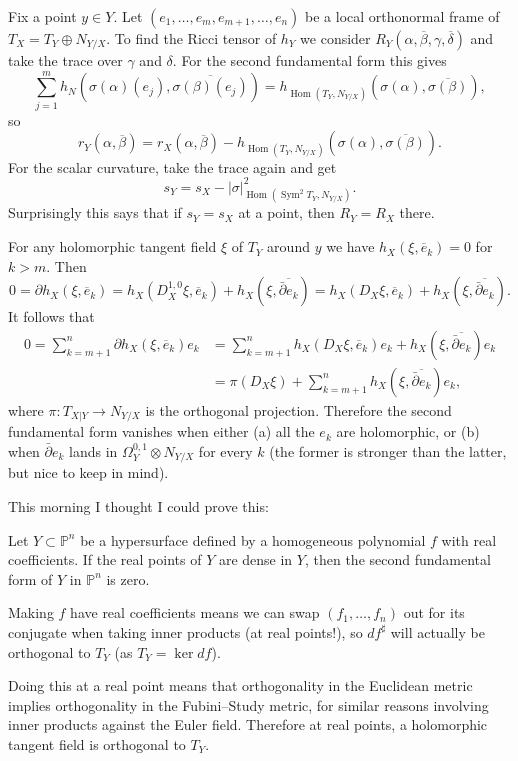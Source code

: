 \documentclass[11pt]{article}
\theoremstyle{definition}
\newcommand{\kk}[1]{\mathbb{#1}}
\def\ov#1{\overline{#1}}
\DeclareMathOperator{\Hom}{Hom}
\begin{document}
Fix a point $y \in Y$.
Let $(e_1,\ldots,e_m,e_{m+1},\ldots,e_n)$ be a local orthonormal frame of $T_X =
T_Y \oplus N_{Y/X}$.
To find the Ricci tensor of $h_Y$ we consider $R_Y(\alpha, \ov\beta, \gamma,
\ov\delta)$ and take the trace over $\gamma$ and $\delta$. For the second
fundamental form this gives
$$
\sum_{j=1}^m h_N(\sigma(\alpha)(e_j), \ov{\sigma(\beta)(e_j)})
= h_{\Hom(T_Y, N_{Y/X})}(\sigma(\alpha), \ov{\sigma(\beta)}),
$$
so
$$
r_Y(\alpha, \ov\beta)
= r_X(\alpha, \ov\beta)
- h_{\Hom(T_Y, N_{Y/X})}(\sigma(\alpha), \ov{\sigma(\beta)}).
$$
For the scalar curvature, take the trace again and get
$$
s_Y = s_X - |\sigma|^2_{\Hom(\operatorname{Sym}^2 T_Y, N_{Y/X})}.
$$
Surprisingly this says that if $s_Y = s_X$ at a point, then $R_Y = R_X$ there.


For any holomorphic tangent field $\xi$ of $T_Y$ around $y$ we have
$h_X(\xi, \ov e_k) = 0$ for $k > m$. Then
$$
0 = \partial h_X(\xi, \ov e_k)
= h_X(D_X^{1,0} \xi, \ov e_k) + h_X(\xi, \ov{\bar\partial e_k})
= h_X(D_X \xi, \ov e_k) + h_X(\xi, \ov{\bar\partial e_k}).
$$
It follows that
\begin{align*}
0
= \!\!\! \sum_{k=m+1}^n \!\!\! \partial h_X(\xi, \ov e_k) e_k
&= \!\!\! \sum_{k=m+1}^n \!\!\! h_X(D_X \xi, \ov e_k)e_k + h_X(\xi, \ov{\bar\partial e_k}) e_k
\\
&= \pi(D_X \xi) + \!\!\! \sum_{k=m+1}^n \!\!\! h_X(\xi, \ov{\bar\partial e_k}) e_k,
\end{align*}
where $\pi : T_{X|Y} \to N_{Y/X}$ is the orthogonal projection.
Therefore the second fundamental form vanishes when either (a) all the $e_k$ are
holomorphic, or (b) when $\bar\partial e_k$ lands in $\Omega_Y^{0,1} \otimes
N_{Y/X}$ for every $k$ (the former is stronger than the latter, but nice to keep
in mind).


This morning I thought I could prove this:

Let $Y \subset \kk P^n$ be a hypersurface defined by a homogeneous polynomial
$f$ with real coefficients.
If the real points of $Y$ are dense in $Y$, then the second fundamental form of
$Y$ in $\kk P^n$ is zero.

Making $f$ have real coefficients means we can swap $(f_1,\ldots,f_n)$ out for
its conjugate when taking inner products (at real points!), so $df^\sharp$ will
actually be orthogonal to $T_Y$ (as $T_Y = \ker df$).

Doing this at a real point means that orthogonality in the Euclidean metric
implies orthogonality in the Fubini--Study metric, for similar reasons involving
inner products against the Euler field.
Therefore at real points, a holomorphic tangent field is orthogonal to $T_Y$.
\end{document}
